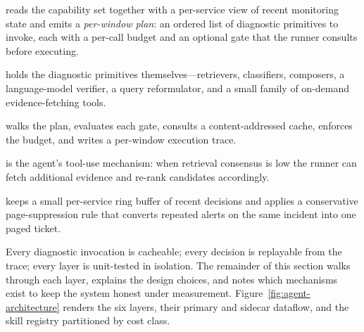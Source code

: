  reads the capability set together with a per-service view of recent monitoring state and emits a \emph{per-window plan}: an ordered list of diagnostic primitives to invoke, each with a per-call budget and an optional gate that the runner consults before executing.

 holds the diagnostic primitives themselves---retrievers, classifiers, composers, a language-model verifier, a query reformulator, and a small family of on-demand evidence-fetching tools.

 walks the plan, evaluates each gate, consults a content-addressed cache, enforces the budget, and writes a per-window execution trace.

 is the agent's tool-use mechanism: when retrieval consensus is low the runner can fetch additional evidence and re-rank candidates accordingly.

 keeps a small per-service ring buffer of recent decisions and applies a conservative page-suppression rule that converts repeated alerts on the same incident into one paged ticket.

Every diagnostic invocation is cacheable; every decision is replayable from the trace; every layer is unit-tested in isolation. The remainder of this section walks through each layer, explains the design choices, and notes which mechanisms exist to keep the system honest under measurement. Figure~\ref{fig:agent-architecture} renders the six layers, their primary and sidecar dataflow, and the skill registry partitioned by cost class.

